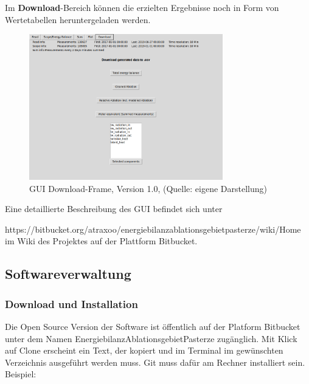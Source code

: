 \documentclass[11pt,a4paper]{article}
\newcommand{\guiplotsize}{0.75}
\newcommand{\guiversion}{1.0}
\begin{document}
Im \textbf{Download}-Bereich können die erzielten Ergebnisse noch in Form von Wertetabellen heruntergeladen werden.

\begin{figure}[H]
\centering
\includegraphics[width=\guiplotsize\textwidth]{pictures/GUI/Download_Frame.png}
\caption[GUI Download-Frame, Version \guiversion]{GUI Download-Frame, Version \guiversion, (Quelle: eigene Darstellung)}
\label{fig:GUI Download-Frame}
\end{figure}

Eine detaillierte Beschreibung des GUI befindet sich unter

\textsf{\small https://bitbucket.org/atraxoo/energiebilanzablationsgebietpasterze/wiki/Home}
 im Wiki des Projektes auf der Plattform Bitbucket.


\subsection{Softwareverwaltung}
\subsubsection{Download und Installation}
Die Open Source Version der Software ist öffentlich auf der  Platform Bitbucket unter dem Namen EnergiebilanzAblationsgebietPasterze zugänglich. Mit Klick auf Clone erscheint ein Text, der kopiert und im Terminal im gewünschten Verzeichnis ausgeführt werden muss. Git muss dafür am Rechner installiert sein.\\

Beispiel:
\end{document}
